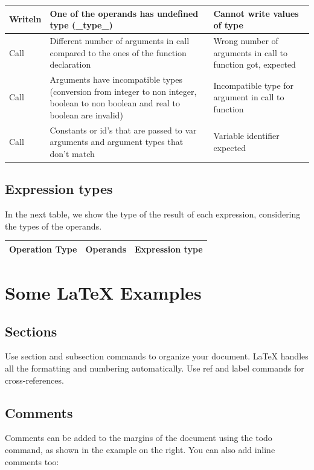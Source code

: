 \documentclass[12pt]{article}
\begin{document}
\begin{tabularx} {\textwidth} {|l|X|X|}
	Writeln 			& One of the operands has undefined type (\_type\_) & Cannot write values of type \\ \hline
	Call 				& Different number of arguments in call compared to the ones of the function declaration & Wrong number of arguments in call to function got, expected \\ \hline
	Call 				& Arguments have incompatible types (conversion from integer to non integer, boolean to non boolean and real to boolean are invalid) & Incompatible type for argument in call to function  \\ \hline
	Call 				& Constants or id's that are passed to var arguments and argument types that don't match & Variable identifier expected  \\ \hline
\end{tabularx}


\subsection{Expression types}

In the next table, we show the type of the result of each expression, considering the types of the operands. \\

\begin{tabularx} {\textwidth} {|X|X|X|} 
 \textbf{Operation Type} 	& \textbf{Operands} & \textbf{Expression type} \\ \hline
	
\end{tabularx}

\section{Some \LaTeX{} Examples}
\label{sec:examples}

\subsection{Sections}

Use section and subsection commands to organize your document. \LaTeX{} handles all the formatting and numbering automatically. Use ref and label commands for cross-references.

\subsection{Comments}

Comments can be added to the margins of the document using the  todo command, as shown in the example on the right. You can also add inline comments too:
\end{document}
